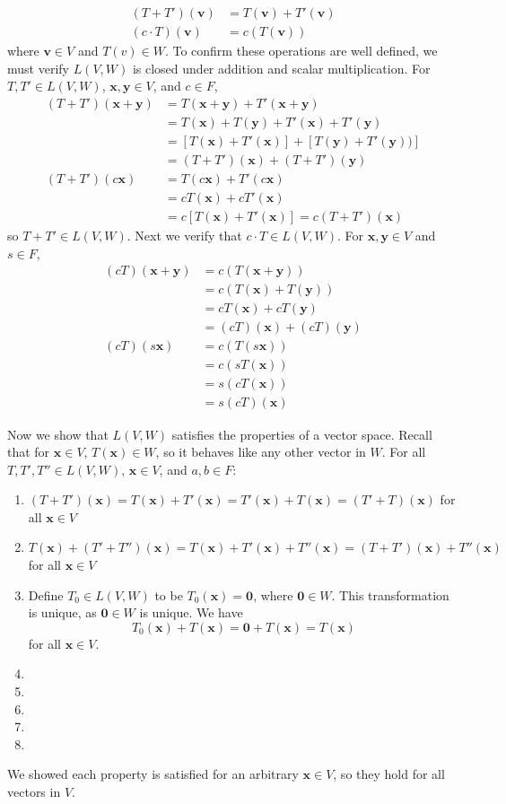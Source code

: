\documentclass{article}
\newcommand{\x}{\mathbf{x}}
\newcommand{\y}{\mathbf{y}}
\newcommand{\ze}{\mathbf{0}}
\theoremstyle{definition}
\begin{document}
\begin{align*}
	(T+T')(\mathbf v) &= T(\mathbf v) + T'(\mathbf v) \\ 
	(c\cdot T)(\mathbf v) &= c(T(\mathbf v))
\end{align*}
where $ \mathbf v\in V $ and $ T(v)\in W $. To confirm these operations are well defined, we must verify $ L(V,W) $ is closed under addition and scalar multiplication. For $ T,T'\in L(V,W) $, $ \x,\y\in V $, and $ c\in F $,
\begin{align*}
	(T+T')(\x+\y) &= T(\x+\y) + T'(\x+\y) \\&= T(\x) + T(\y) + T'(\x) + T'(\y)\\& = [T(\x) + T'(\x)] + [T(\y) + T'(\y))] \\& = (T+T')(\x) +(T+T')(\y) \\ (T+T')(c\x) &= T(c\x) + T'(c\x)\\ & = cT(\x) + cT'(\x) \\ & = c[T(\x) + T'(\x)] = c(T+T')(\x)
\end{align*}
so $ T+T'\in L(V,W) $. Next we verify that $ c\cdot T\in L(V,W) $. For $ \x,\y \in V $ and $ s\in F $, 
\begin{align*}
	(cT)(\x +\y) &= c(T(\x +\y)) \\
	& = c(T(\x) + T(\y)) \\ & = cT(\x) + cT(\y) \\ & = (cT)(\x) + (cT)(\y)\\ 
	(cT)(s\x) & = c(T(s\x)) \\& = c(sT(\x)) \\ & = s(cT(\x)) \\ & = s(cT)(\x)
\end{align*}


Now we show that $ L(V,W) $ satisfies the properties of a vector space. Recall that for $ \x\in V $, $ T(\x)\in W $, so it behaves like any other vector in $ W $. For all $ T,T',T''\in L(V,W) $, $ \x\in V  $, and $ a,b\in F $: 
\begin{enumerate}
	\item $ (T+T')(\x) = T(\x) + T'(\x) = T'(\x) + T(\x) = (T'+T)(\x)$ for all $ \x\in V $
	\item $ T(\x) +(T' +T'')(\x) = T(\x) + T'(\x) + T''(\x) = (T+T')(\x) + T''(\x)  $ for all $ \x\in V $
	\item Define $ T_0 \in L(V,W) $ to be $ T_0(\x) = \ze $, where $ \ze \in W $. This transformation is unique, as $ \ze\in W $ is unique. We have 
	$$ T_0(\x) + T(\x) = \ze + T(\x) = T(\x) $$  
	for all $ \x\in V $. 
	\item 
	\item 
	\item 
	\item 
	\item 
\end{enumerate}
We showed each property is satisfied for an arbitrary $ \x\in V $, so they hold for all vectors in $ V $. 
\end{document}
